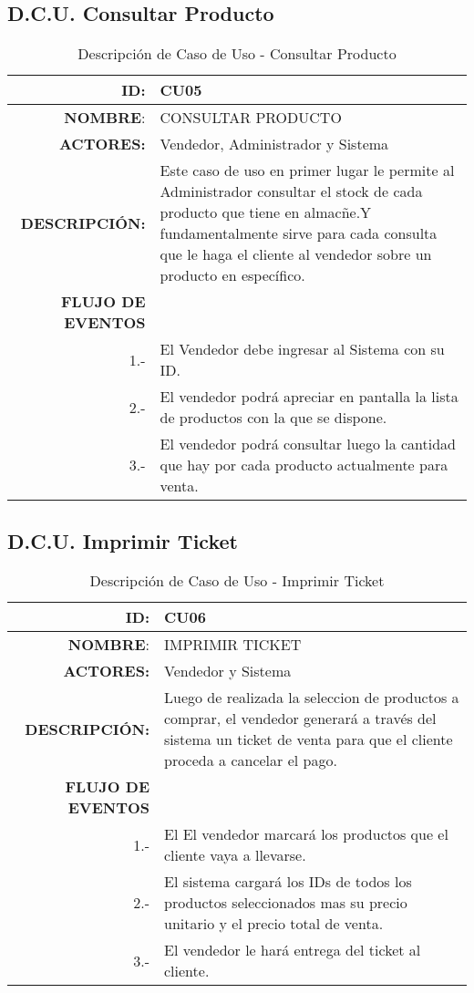 \documentclass[a4paper,11pt, spanish]{report}
\begin{document}
{{{{{{{{{{{{{{{{{{\subsection{D.C.U. Consultar Producto}

  {\renewcommand{\arraystretch}{1.25}%
  \begin{table}[H]
  \begin{tabularx}{\textwidth}{r|X}
  \textbf{ID}: & CU05\\\hline
  \textbf{NOMBRE}: & CONSULTAR PRODUCTO\\\hline
  \textbf{ACTORES:} & Vendedor, Administrador y Sistema \\\hline
  \textbf{DESCRIPCIÓN:} & Este caso de uso en primer lugar le permite al Administrador consultar el stock de cada producto que tiene en almacñe.Y fundamentalmente sirve para cada consulta que le haga el cliente al vendedor sobre un producto en específico.\\\hline
  \textbf{FLUJO DE EVENTOS}  \\
  1.- & El Vendedor debe ingresar al Sistema con su ID.\\
  2.- & El vendedor podrá apreciar en pantalla la lista de productos con la que se dispone.\\
  3.- & El vendedor podrá consultar luego la cantidad que hay por cada producto actualmente para venta.\\\hline
  \end{tabularx}
  \caption{Descripción de Caso de Uso - Consultar Producto}
  \end{table}

\subsection{D.C.U. Imprimir Ticket}

  {\renewcommand{\arraystretch}{1.25}%
  \begin{table}[H]
  \begin{tabularx}{\textwidth}{r|X}
  \textbf{ID}: & CU06\\\hline
  \textbf{NOMBRE}: & IMPRIMIR TICKET\\\hline
  \textbf{ACTORES:} & Vendedor y Sistema \\\hline
  \textbf{DESCRIPCIÓN:} & Luego de realizada la seleccion de productos a comprar, el vendedor generará a través del sistema un ticket de venta para que el cliente proceda a cancelar el pago.\\\hline
  \textbf{FLUJO DE EVENTOS}  \\
  1.- & El El vendedor marcará los productos que el cliente vaya a llevarse.\\
  2.- & El sistema cargará los IDs de todos los productos seleccionados mas su precio unitario y el precio total de venta.\\
  3.- & El vendedor le hará entrega del ticket al cliente.\\
  \end{tabularx}
  \caption{Descripción de Caso de Uso - Imprimir Ticket}
  \end{table}

}}}}}}}}}}}}}}}}}}}}
\end{document}
